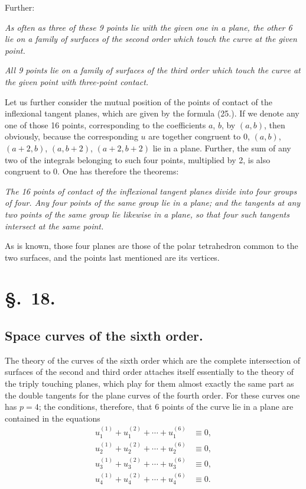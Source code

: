 \documentclass{article}
\begin{document}
Further:

\emph{As often as three of these 9 points lie with the given one in a plane, the other 6 lie on a family of surfaces of the second order which touch the curve at the given point.}

\emph{All 9 points lie on a family of surfaces of the third order which touch the curve at the given point with three-point contact.}

Let us further consider the mutual position of the points of contact of the inflexional tangent planes, which are given by the formula (25.). If we denote any one of those 16 points, corresponding to the coefficients $a$, $b$, by $(a,b)$, then obviously, because the corresponding $u$ are together congruent to 0, $(a,b)$, $(a+2,b)$, $(a,b+2)$, $(a+2,b+2)$ lie in a plane. Further, the sum of any two of the integrals belonging to such four points, multiplied by 2, is also congruent to 0. One has therefore the theorems:

\emph{The 16 points of contact of the inflexional tangent planes divide into four groups of four. Any four points of the same group lie in a plane; and the tangents at any two points of the same group lie likewise in a plane, so that four such tangents intersect at the same point.}

As is known, those four planes are those of the polar tetrahedron common to the two surfaces, and the points last mentioned are its vertices.

\section*{§.~18.}
\subsection*{Space curves of the sixth order.}

The theory of the curves of the sixth order which are the complete intersection of surfaces of the second and third order attaches itself essentially to the theory of the triply touching planes, which play for them almost exactly the same part as the double tangents for the plane curves of the fourth order. For these curves one has $p=4$; the conditions, therefore, that 6 points of the curve lie in a plane are contained in the equations
\[
\begin{aligned}
u_{1}^{(1)}+u_{1}^{(2)}+\cdots+u_{1}^{(6)} &\equiv 0,\\
u_{2}^{(1)}+u_{2}^{(2)}+\cdots+u_{2}^{(6)} &\equiv 0,\\
u_{3}^{(1)}+u_{3}^{(2)}+\cdots+u_{3}^{(6)} &\equiv 0,\\
u_{4}^{(1)}+u_{4}^{(2)}+\cdots+u_{4}^{(6)} &\equiv 0.
\end{aligned}
\]
\end{document}
